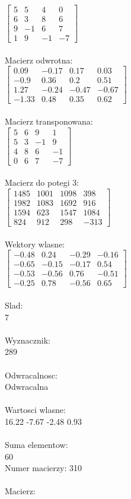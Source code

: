 \documentclass[a4paper,12pt]{article}
\begin{document}
$\begin{bmatrix} 5&5&4&0\\6&3&8&6\\9&-1&6&7\\1&9&-1&-7 \end{bmatrix}$
\\
\\
Macierz odwrotna:\\

$\begin{bmatrix} 0.09&-0.17&0.17&0.03\\-0.9&0.36&0.2&0.51\\1.27&-0.24&-0.47&-0.67\\-1.33&0.48&0.35&0.62 \end{bmatrix}$
\\
\\
Macierz transponowana:\\

$\begin{bmatrix} 5&6&9&1\\5&3&-1&9\\4&8&6&-1\\0&6&7&-7 \end{bmatrix}$
\\
\\
Macierz do potegi 3:\\

$\begin{bmatrix} 1485&1001&1098&398\\1982&1083&1692&916\\1594&623&1547&1084\\824&912&298&-313 \end{bmatrix}$
\\
\\
Wektory wlasne:\\

$\begin{bmatrix} -0.48&0.24&-0.29&-0.16\\-0.65&-0.15&-0.17&0.54\\-0.53&-0.56&0.76&-0.51\\-0.25&0.78&-0.56&0.65 \end{bmatrix}$
\\
\\
Slad:\\
7
\\
\\
Wyznacznik:\\
289
\\
\\
Odwracalnosc:\\
Odwracalna
\\
\\
Wartosci wlasne:\\
16.22 -7.67 -2.48 0.93
\\
\\
Suma elementow:\\
60
\\
\newpage
Numer macierzy:
310
\\
\\
Macierz:\\
\end{document}
